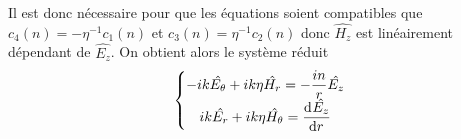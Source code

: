   Il est donc nécessaire pour que les équations soient compatibles que \(c_4(n)=-\eta^{-1} c_1(n)\) et \( c_3(n) = \eta^{-1}c_2(n)\) donc \(\hat{H_z}\) est linéairement dépendant de \(\hat{E_z}\). On obtient alors le système réduit
      \begin{equation}
      \left\lbrace
      \begin{matrix}
          -ik\hat{E_\theta} + ik\eta \hat{H_r} = -\frac{in}{r}\hat{E_z}
          \\
          ik\hat{E_r} + ik\eta \hat{H_\theta} = \ddp{r}{\hat{E_z}}
      \end{matrix}
      \right.
  \end{equation}